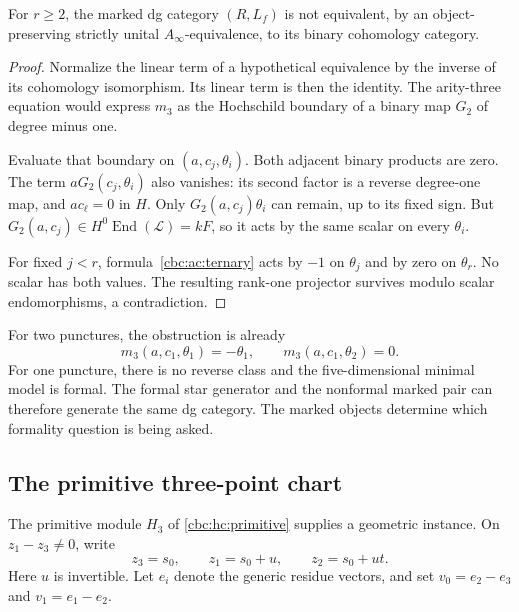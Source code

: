 \begin{theorem}\label{cbc:ac:marked-nonformality}
For $r\geq2$, the marked dg category $(R,L_f)$ is
not equivalent, by an object-preserving strictly
unital $A_\infty$-equivalence, to its binary
cohomology category.
\end{theorem}
\begin{proof}
Normalize the linear term of a hypothetical equivalence
by the inverse of its cohomology isomorphism. Its
linear term is then the identity. The arity-three
equation would express $m_3$ as the Hochschild boundary
of a binary map $G_2$ of degree minus one.

Evaluate that boundary on $(a,c_j,\theta_i)$.
Both adjacent binary products are zero. The term
$aG_2(c_j,\theta_i)$ also vanishes: its second
factor is a reverse degree-one map, and $ac_\ell=0$
in $H$. Only $G_2(a,c_j)\theta_i$ can remain,
up to its fixed sign. But
$G_2(a,c_j)\in H^0\operatorname{End}(\mathcal L)=kF$,
so it acts by the same scalar on every $\theta_i$.

For fixed $j<r$, formula~\eqref{cbc:ac:ternary}
acts by $-1$ on $\theta_j$ and by zero on
$\theta_r$. No scalar has both values.
The resulting rank-one projector survives modulo
scalar endomorphisms, a contradiction.
\end{proof}

For two punctures, the obstruction is already
\[
 m_3(a,c_1,\theta_1)=-\theta_1,\qquad
 m_3(a,c_1,\theta_2)=0.
\]
For one puncture, there is no reverse class and
the five-dimensional minimal model is formal.
The formal star generator and the nonformal marked
pair can therefore generate the same dg category.
The marked objects determine which formality question
is being asked.

\subsection{The primitive three-point chart}

The primitive module $H_3$ of
\eqref{cbc:hc:primitive} supplies a geometric instance.
On $z_1-z_3\ne0$, write
\[
 z_3=s_0,\qquad z_1=s_0+u,\qquad z_2=s_0+ut.
\]
Here $u$ is invertible. Let $e_i$ denote the generic
residue vectors, and set $v_0=e_2-e_3$ and
$v_1=e_1-e_2$.

